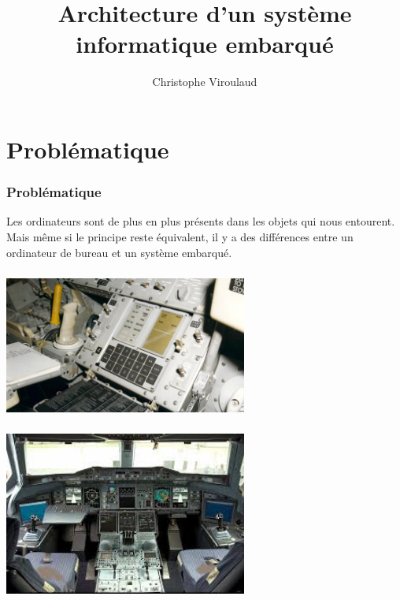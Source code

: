 \documentclass[svgnames,11pt]{beamer}
\author[]{Christophe Viroulaud}
\title{Architecture d'un système informatique embarqué}
\date{}
\institute{Seconde SNT}
\begin{document}
\begin{frame}
\titlepage
\end{frame}

\section{Problématique}
\begin{frame}
    \frametitle{Problématique}

    Les ordinateurs sont de plus en plus présents dans les objets qui nous entourent. Mais même si le principe reste équivalent, il y a des différences entre un ordinateur de bureau et un système embarqué.

\end{frame}
\begin{frame}
    \frametitle{}

    \begin{center}
    \centering
    \includegraphics[width=8cm]{ressources/apollo.jpeg}
    \label{IMG}
    \end{center}

\end{frame}
\begin{frame}
    \frametitle{}

    \begin{center}
    \centering
    \includegraphics[width=8cm]{ressources/a320.jpeg}
    \label{IMG}
    \end{center}

\end{frame}
\end{document}
